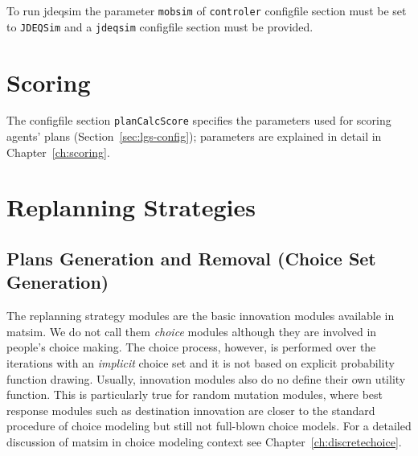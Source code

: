 To run \gls{jdeqsim} the parameter \lstinline|mobsim| of \lstinline|controler| \gls{configfile} section must be set to \lstinline|JDEQSim| and a \lstinline|jdeqsim| \gls{configfile} section must be provided. 

\section{Scoring}
\label{sec:using-scoring}
The \gls{configfile} section \lstinline|planCalcScore| specifies the parameters used for scoring agents' plans (Section~\ref{sec:lgs-config}); parameters are explained in detail in Chapter~\ref{ch:scoring}.


\section{Replanning Strategies}
\label{sec:strategymodules}

\subsection{Plans Generation and Removal (Choice Set Generation)}

The replanning strategy modules are the basic innovation modules available in \gls{matsim}. We do not call them \emph{choice} modules although they are involved in people's choice making. The choice process, however, is performed over the iterations with an \emph{implicit} choice set and it is not based on explicit probability function drawing. Usually, innovation modules also do no define their own utility function. This is particularly true for random mutation modules, where best response modules such as destination innovation are closer to the standard procedure of choice modeling but still not full-blown choice models. For a detailed discussion of \gls{matsim} in choice modeling context see Chapter~\ref{ch:discretechoice}.

